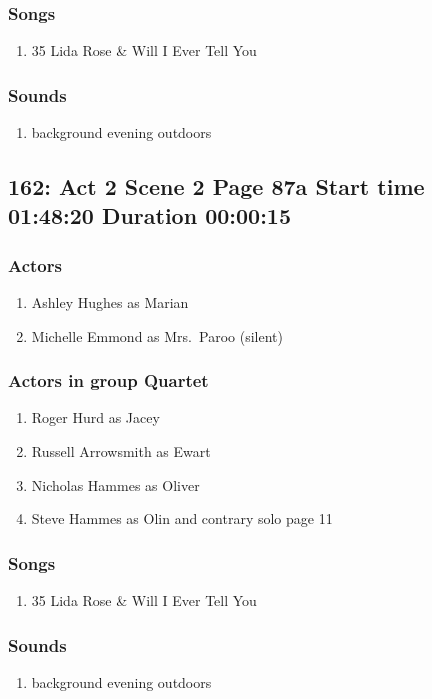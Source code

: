 \subsubsection{Songs}
\begin{enumerate}
\item 35 Lida Rose \& Will I Ever Tell You
\end{enumerate}\subsubsection{Sounds}
\begin{enumerate}
\item background evening outdoors
\end{enumerate}
\subsection{162: Act 2 Scene 2 Page 87a Start time 01:48:20 Duration 00:00:15}

\subsubsection{Actors}
\begin{enumerate}
\item Ashley Hughes as Marian
\item Michelle Emmond as Mrs.~Paroo (silent)
\end{enumerate}
\subsubsection{Actors in group Quartet}
\begin{enumerate}
\item Roger Hurd as Jacey
\item Russell Arrowsmith as Ewart
\item Nicholas Hammes as Oliver
\item Steve Hammes as Olin and contrary solo page 11
\end{enumerate}

\subsubsection{Songs}
\begin{enumerate}
\item 35 Lida Rose \& Will I Ever Tell You
\end{enumerate}\subsubsection{Sounds}
\begin{enumerate}
\item background evening outdoors
\end{enumerate}
